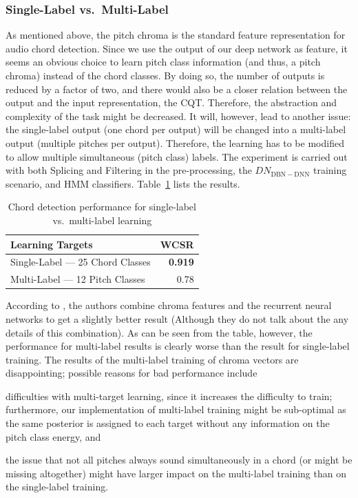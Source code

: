 \documentclass{article}
\begin{document}
\subsubsection{Single-Label vs.\ Multi-Label}
As mentioned above, the pitch chroma is the standard feature representation for audio chord detection. Since we use the output of our deep network as feature, it seems an obvious choice to learn pitch class information (and thus, a pitch chroma) instead of the chord classes. By doing so, the number of outputs is reduced by a factor of two, and there would also be a closer relation between the output and the input representation, the CQT. Therefore, the abstraction and complexity of the task might be decreased. It will, however, lead to another issue: the single-label output (one chord per output) will be changed into a multi-label output (multiple pitches per output). Therefore, the learning has to be modified to allow multiple simultaneous (pitch class) labels. 
The experiment is carried out with both Splicing and Filtering in the pre-processing, the $DN_\mathrm{DBN-DNN}$ training scenario, and HMM classifiers. Table~\ref{tab:multilabel} lists the results. 

\begin{table}
\centering
\begin{tabular*}{\columnwidth}{@{\extracolsep{\fill}}lr}
\toprule
\textbf{Learning Targets} & \textbf{WCSR}  \\ \midrule
Single-Label --- 25 Chord Classes & \textbf{0.919} \\
Multi-Label --- 12 Pitch Classes & 0.78  \\ \bottomrule
\end{tabular*}
\caption{Chord detection performance for single-label vs.\ multi-label learning}
\label{tab:multilabel}
\end{table}
According to \cite{boulanger2013audio}, the authors combine chroma features and the recurrent neural networks to get a slightly better result (Although they do not talk about the any details of this combination). 
As can be seen from the table, however, the performance for multi-label results is clearly worse than the result for single-label training.
The results of the multi-label training of chroma vectors are disappointing; possible reasons for bad performance include
\begin{inparaenum}[(i)]
    \item   difficulties with multi-target learning, since it increases the difficulty to train; furthermore, our implementation of multi-label training might be sub-optimal as the same posterior is assigned to each target without any information on the pitch class energy, and
    \item   the issue that not all pitches always sound simultaneously in a chord (or might be missing altogether) might have larger impact on the multi-label training than on the single-label training.    
\end{inparaenum}
\end{document}
